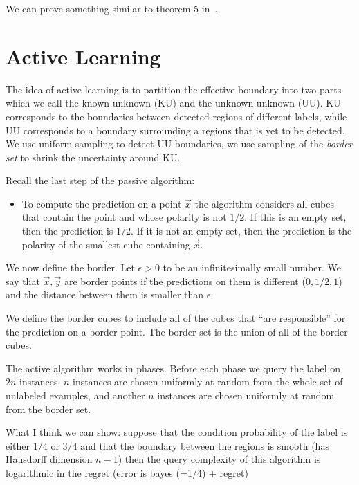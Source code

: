 \documentclass{article}
\newcommand{\x}{\vec{x}}
\newcommand{\y}{\vec{y}}
\begin{document}
We can prove something similar to theorem 5 in~\cite{ChaudhuriDas2014}.

\section{Active Learning}

The idea of active learning is to partition the effective boundary
into two parts which we call the known unknown (KU) and the unknown
unknown (UU). KU corresponds to the boundaries between detected
regions of different labels, while UU corresponds to a boundary
surrounding a regions that is yet to be detected. We use uniform
sampling to detect UU boundaries, we use sampling of the {\em border
  set} to shrink the uncertainty around KU.

Recall the last step of the passive algorithm:

\begin{itemize}
  \item To compute the prediction on a point $\x$ the algorithm
  considers all cubes that contain the point and whose polarity is not
  $1/2$. If this is an empty set, then the prediction is $1/2$. If it
  is not an empty set, then the prediction is the polarity of the
  smallest cube containing $\x$.
\end{itemize}

We now define the border. Let $\epsilon>0$ to be an infinitesimally small
number. We say that $\x,\y$ are border points if the predictions on
them is different ($0,1/2,1$) and the distance between them is smaller
than $\epsilon$.

We define the border cubes to include all of the cubes that ``are
responsible'' for the prediction on a border point. The border set is
the union of all of the border cubes.

The active algorithm works in phases. Before each phase we query the
label on $2n$ instances. $n$ instances are chosen uniformly at random
from the whole set of unlabeled examples, and another $n$ instances
are chosen uniformly at random from the border set.

What I think we can show: suppose that the condition probability of
the label is either $1/4$ or $3/4$ and that the boundary
between the regions is smooth (has Hausdorff dimension $n-1$) then the
query complexity of this algorithm is logarithmic in the regret (error
is bayes (=1/4) + regret)
\end{document}

